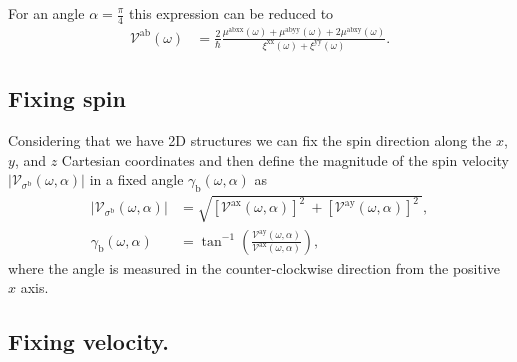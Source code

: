 \documentclass[prb,11pt,tightenlines,twocolumn,aps]{revtex4-1}
\begin{document}
For an angle $\alpha = \frac{\pi}{4}$ this expression can be reduced to 
\begin{align}
\mathcal{V}^{\mathrm{ab}} (\omega)
&= \frac{2}{\hbar}
\frac{\mu^{\mathrm{abxx}}(\omega) + \mu^{\mathrm{abyy}}(\omega) + 
2\mu^{\mathrm{abxy}}(\omega)}
{\xi^{\mathrm{xx}}(\omega) + \xi^{\mathrm{yy}}(\omega)}.
\label{eq:vab-90deg}
\end{align}




\subsection{Fixing spin}\label{sec:theory-fixspin}
Considering that we have 2D structures we can fix the spin direction along the
$x$, $y$, and $z$ Cartesian coordinates and then define the magnitude of the
spin velocity $|\mathcal{V}_{\sigma^{\mathrm{b}}}(\omega,\alpha)|$ in a fixed angle $\gamma_{\mathrm{b}}(\omega,\alpha)$ as
\begin{align}
|\mathcal{V}_{\sigma^{\mathrm{b}}}(\omega,\alpha)| 
&=
\sqrt{
[\mathcal{V}^{\mathrm{ax}}(\omega,\alpha)]^{2}\ +
[\mathcal{V}^{\mathrm{ay}}(\omega,\alpha)]^{2}\ 
}, 
\label{eq:vs-mag}
\\
\gamma_{\mathrm{b}} (\omega,\alpha)
&=
\tan^{-1} \left( \frac{\mathcal{V}^{\mathrm{ay}}(\omega,\alpha)}
{\mathcal{V}^{\mathrm{ax}}(\omega,\alpha)} \right),
\label{eq:gamma-ang}
\end{align}
where the angle is measured in the counter-clockwise direction from the positive
$x$ axis.




\subsection{Fixing velocity.}\label{sec:theory-fixvel}
\end{document}
